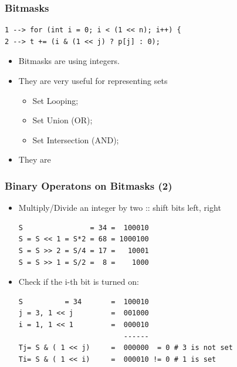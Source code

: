\documentclass{beamer}
\begin{document}
\begin{frame}[fragile]
  \frametitle{Bitmasks}

\begin{block}{}
\begin{verbatim}
1 --> for (int i = 0; i < (1 << n); i++) {
2 --> t += (i & (1 << j) ? p[j] : 0);
\end{verbatim}
\end{block}

\begin{itemize}
  \item Bitmasks are  using \alert{integers}.
  \bigskip

  \item They are very useful for representing \alert{sets}
  \begin{itemize}
    \item Set Looping;
    \item Set Union (OR);
    \item Set Intersection (AND);
  \end{itemize}
  \bigskip

  \item They are 
  \end{itemize}
\end{frame}

\begin{frame}[fragile]
  \frametitle{Binary Operatons on Bitmasks (2)}
{\smaller

  \begin{itemize}
  \item Multiply/Divide an integer by two :: shift bits left, right
\begin{verbatim}
S                = 34 =  100010
S = S << 1 = S*2 = 68 = 1000100
S = S >> 2 = S/4 = 17 =   10001
S = S >> 1 = S/2 =  8 =    1000
\end{verbatim}
\bigskip

\item Check if the i-th bit is turned on:
\begin{verbatim}
S          = 34       =  100010
j = 3, 1 << j         =  001000
i = 1, 1 << 1         =  000010
                         ------
Tj= S & ( 1 << j)     =  000000  = 0 # 3 is not set
Ti= S & ( 1 << i)     =  000010 != 0 # 1 is set
\end{verbatim}

  \end{itemize}

}
\end{frame}
\end{document}
